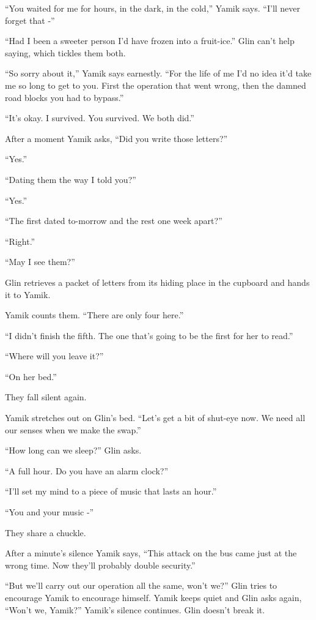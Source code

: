\documentclass[twoside,11pt]{book}
\begin{document}
``You waited for me for hours, in the dark, in the cold,'' Yamik says. ``I'll
never forget that -''

``Had I been a sweeter person I'd have frozen into a fruit-ice.'' Glin can't help saying,
which tickles them both.

``So sorry about it,'' Yamik says earnestly. ``For the life of me I'd no idea
it'd take me so long to get to you. First the operation that went wrong, then the damned road blocks you had to
bypass.''

``It's okay. I survived. You survived. We both did.''

After a moment Yamik asks, ``Did you write those letters?''

``Yes.''

``Dating them the way I told you?''

``Yes.''

``The first dated to-morrow and the rest one week apart?''

``Right.''

``May I see them?''

Glin retrieves a packet of letters from its hiding place in the cupboard and hands it to Yamik.

Yamik counts them. ``There are only four here.''

``I didn't finish the fifth. The one that's going to be the first for her to read.''

``Where will you leave it?''

``On her bed.''

They fall silent again.

Yamik stretches out on Glin's bed. ``Let's get a bit of shut-eye now. We need all our senses when we make
the swap.''

``How long can we sleep?'' Glin asks.

``A full hour. Do you have an alarm clock?''

``I'll set my mind to a piece of music that lasts an hour.''

``You and your music -''

They share a chuckle.

After a minute's silence Yamik says, ``This attack on the bus came just at the wrong time. Now they'll
probably double security.''

``But we'll carry out our operation all the same, won't we?'' Glin tries to encourage Yamik to
encourage himself. Yamik keeps quiet and Glin asks again, ``Won't we, Yamik?'' Yamik's
silence continues. Glin doesn't break it.
\end{document}
